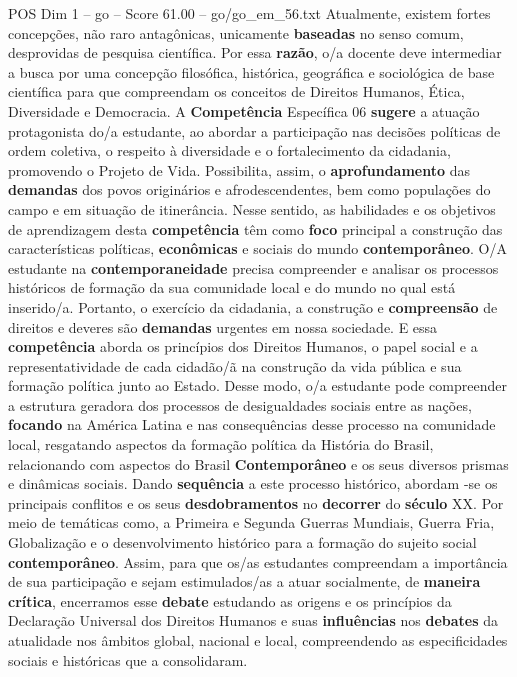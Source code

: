 \begin{textsample}{POS Dim 1 – go – Score 61.00 – go/go\_em\_56.txt}
Atualmente, existem fortes concepções, não raro antagônicas, unicamente \textbf{baseadas} no senso comum, desprovidas de pesquisa científica.
Por essa \textbf{razão}, o/a docente deve intermediar a busca por uma concepção filosófica, histórica, geográfica e sociológica de base científica para que compreendam os conceitos de Direitos Humanos, Ética, Diversidade e Democracia.
A \textbf{Competência} Específica 06 \textbf{sugere} a atuação protagonista do/a estudante, ao abordar a participação nas decisões políticas de ordem coletiva, o respeito à diversidade e o fortalecimento da cidadania, promovendo o Projeto de Vida.
Possibilita, assim, o \textbf{aprofundamento} das \textbf{demandas} dos povos originários e afrodescendentes, bem como populações do campo e em situação de itinerância.
Nesse sentido, as habilidades e os objetivos de aprendizagem desta \textbf{competência} têm como \textbf{foco} principal a construção das características políticas, \textbf{econômicas} e sociais do mundo \textbf{contemporâneo}.
O/A estudante na \textbf{contemporaneidade} precisa compreender e analisar os processos históricos de formação da sua comunidade local e do mundo no qual está inserido/a.
Portanto, o exercício da cidadania, a construção e \textbf{compreensão} de direitos e deveres são \textbf{demandas} urgentes em nossa sociedade.
E essa \textbf{competência} aborda os princípios dos Direitos Humanos, o papel social e a representatividade de cada cidadão/ã na construção da vida pública e sua formação política junto ao Estado.
Desse modo, o/a estudante pode compreender a estrutura geradora dos processos de desigualdades sociais entre as nações, \textbf{focando} na América Latina e nas consequências desse processo na comunidade local, resgatando aspectos da formação política da História do Brasil, relacionando com aspectos do Brasil \textbf{Contemporâneo} e os seus diversos prismas e dinâmicas sociais.
Dando \textbf{sequência} a este processo histórico, abordam -se os principais conflitos e os seus \textbf{desdobramentos} no \textbf{decorrer} do \textbf{século} XX.
Por meio de temáticas como, a Primeira e Segunda Guerras Mundiais, Guerra Fria, Globalização e o desenvolvimento histórico para a formação do sujeito social \textbf{contemporâneo}.
Assim, para que os/as estudantes compreendam a importância de sua participação e sejam estimulados/as a atuar socialmente, de \textbf{maneira} \textbf{crítica}, encerramos esse \textbf{debate} estudando as origens e os princípios da Declaração Universal dos Direitos Humanos e suas \textbf{influências} nos \textbf{debates} da atualidade nos âmbitos global, nacional e local, compreendendo as especificidades sociais e históricas que a consolidaram.

\end{textsample}
